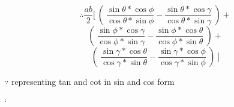 \documentclass[journal,12pt,twocolumn]{IEEEtran}
\begin{document}
$$\therefore \frac{ab}{2}[~(~\frac{\sin\theta*\cos\phi}{\cos\theta*\sin\phi}- \frac{\sin\theta*\cos\gamma}{\cos\theta*\sin\gamma}~)+$$ 
    $$(~\frac{\sin\phi*\cos\gamma}{\cos\phi*\sin\gamma}-\frac{\sin\phi*\cos\theta}{\cos\phi*\sin\theta}~)
    +$$
    $$(~\frac{\sin\gamma*\cos\theta}{\cos\gamma*\sin\theta}-\frac{\sin\gamma*\cos\phi}{\cos\gamma*\sin\phi}~)~]$$
\begin{flushright}
$\because$ representing tan and cot in sin and cos form\end{flushright} `

\end{document}
